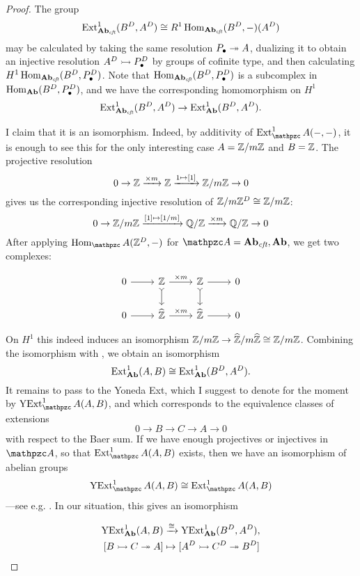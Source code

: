 \begin{proof}
  The group
  \[ \operatorname{Ext}^1_{\text{\bf Ab}_\text{\it cft}} (B^D,A^D) \cong
    R^1 \operatorname{Hom}_{\text{\bf Ab}_\text{\it cft}} (B^D, -) (A^D) \]
  may be calculated by taking the same resolution $P_\bullet \twoheadrightarrow A$, dualizing
  it to obtain an injective resolution $A^D \rightarrowtail P_\bullet^D$ by groups of
  cofinite type, and then calculating
  $H^1 \operatorname{Hom}_{\text{\bf Ab}_\text{\it cft}} (B^D, P_\bullet^D)$. Note that
  $\operatorname{Hom}_{\text{\bf Ab}_\text{\it cft}} (B^D, P_\bullet^D)$ is a subcomplex in
  $\operatorname{Hom}_{\text{\bf Ab}} (B^D, P_\bullet^D)$, and we have the corresponding
  homomorphism on $H^1$
  \begin{equation}
    \label{eqn:Ext-Abcft-Ext-Ab}
    \operatorname{Ext}^1_{\text{\bf Ab}_\text{\it cft}} (B^D,A^D) \to
    \operatorname{Ext}^1_{\text{\bf Ab}} (B^D,A^D).
  \end{equation}

  I claim that it is an isomorphism. Indeed, by additivity of
  $\Ext^1_\vcateg{A} (-,-)$, it is enough to see this for the only interesting
  case $A = \mathbb{Z}/m\mathbb{Z}$ and $B = \mathbb{Z}$. The projective resolution
  \[ 0 \to \mathbb{Z} \xrightarrow{\times m} \mathbb{Z} \xrightarrow{1 \mapsto [1]}
    \mathbb{Z}/m\mathbb{Z} \to 0 \]
  gives us the corresponding injective resolution of
  $\mathbb{Z}/m\mathbb{Z}^D \cong \mathbb{Z}/m\mathbb{Z}$:
  \[ 0 \to \mathbb{Z}/m\mathbb{Z} \xrightarrow{[1] \mapsto [1/m]}
    \mathbb{Q}/\mathbb{Z} \xrightarrow{\times m} \mathbb{Q}/\mathbb{Z} \to 0 \]
  After applying $\Hom_\vcateg{A} (\ZZ^D, -)$ for
  $\vcateg{A} = \categ{Ab}_\text{\it cft}, \categ{Ab}$, we get two complexes:

  \[ \begin{tikzcd}
      0\arrow{r} & \ZZ \arrow{r}{\times m}\arrow[rightarrowtail]{d} & \ZZ\arrow{r}\arrow[rightarrowtail]{d} & 0 \\
      0\arrow{r} & \widehat{\ZZ} \arrow{r}{\times m} & \widehat{\ZZ}\arrow{r} & 0
    \end{tikzcd} \]

  \noindent On $H^1$ this indeed induces an isomorphism
  $\mathbb{Z}/m\mathbb{Z} \to \widehat{\mathbb{Z}}/m\widehat{\mathbb{Z}} \cong \mathbb{Z}/m\mathbb{Z}$. Combining the
  isomorphism  with ,
  we obtain an isomorphism
  $$\operatorname{Ext}^1_{\text{\bf Ab}} (A,B) \cong \operatorname{Ext}^1_{\text{\bf Ab}} (B^D, A^D).$$
  It remains to pass to the Yoneda Ext, which I suggest to denote for the moment
  by $\YExt^1_\vcateg{A} (A,B)$, and which corresponds to the equivalence
  classes of extensions
  $$0 \to B \to C \to A \to 0$$
  with respect to the Baer sum. If we have enough projectives or injectives in
  $\vcateg{A}$, so that $\Ext^1_\vcateg{A} (A,B)$ exists, then we have an
  isomorphism of abelian groups
  $$\YExt^1_\vcateg{A} (A,B) \isom \Ext^1_\vcateg{A} (A,B)$$
  ---see e.g. \cite[\S 3.4]{Weibel-94}. In our situation, this gives an
  isomorphism

  \begin{align*}
    \operatorname{YExt}^1_{\text{\bf Ab}} (A,B) & \xrightarrow{\cong}
                                 \operatorname{YExt}^1_{\text{\bf Ab}} (B^D,A^D),\\
    {} [B \rightarrowtail C \twoheadrightarrow A] & \mapsto [A^D \rightarrowtail C^D \twoheadrightarrow B^D]
  \end{align*}
\end{proof}

